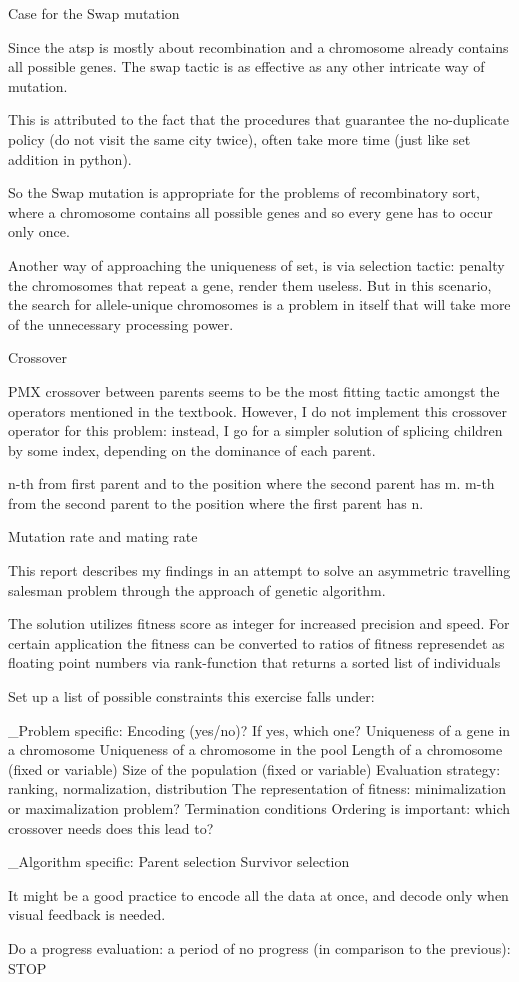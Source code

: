 Case for the Swap mutation

    Since the atsp is mostly about recombination and a chromosome already
    contains all possible genes. The swap tactic is as effective
    as any other intricate way of mutation.

    This is attributed to the fact that the procedures that guarantee the
    no-duplicate policy (do not visit the same city twice), often take more
    time (just like set addition in python).

    So the Swap mutation is appropriate for the problems of recombinatory sort,
    where a chromosome contains all possible genes and so every gene has to
    occur only once.

    Another way of approaching the uniqueness of set, is via selection tactic:
    penalty the chromosomes that repeat a gene, render them useless. But in this
    scenario, the search for allele-unique chromosomes is a problem in itself
    that will take more of the unnecessary processing power.


Crossover

    PMX crossover between parents seems to be the most fitting tactic amongst
    the operators mentioned in the textbook. However, I do not implement this
    crossover operator for this problem: instead, I go for a simpler solution
    of splicing children by some index, depending on the dominance of each
    parent.

    n-th from first parent and to the position where the second parent has m.
    m-th from the second parent to the position where the first parent has n.


Mutation rate and mating rate



This report describes my findings in an attempt to solve an
asymmetric travelling salesman problem through the approach
of genetic algorithm.

The solution utilizes fitness score as integer for increased precision
and speed. For certain application the fitness can be converted to
ratios of fitness represendet as floating point numbers via rank-function
that returns a sorted list of individuals


Set up a list of possible constraints this exercise falls under:

    _Problem specific:
    Encoding (yes/no)? If yes, which one?
    Uniqueness of a gene in a chromosome
    Uniqueness of a chromosome in the pool
    Length of a chromosome (fixed or variable)
    Size of the population (fixed or variable)
    Evaluation strategy: ranking, normalization, distribution
    The representation of fitness: minimalization or maximalization problem?
    Termination conditions
    Ordering is important: which crossover needs does this lead to?


    _Algorithm specific:
    Parent selection
    Survivor selection


It might be a good practice to encode all the data at once, and decode only
when visual feedback is needed.

Do a progress evaluation: a period of no progress
(in comparison to the previous): STOP


